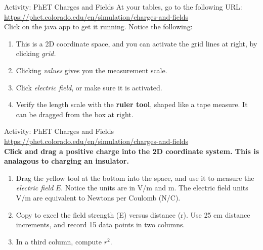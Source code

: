 \documentclass{beamer}
\begin{document}
\begin{frame}{Activity: PhET Charges and Fields}
At your tables, go to the following URL: \\ \vspace{0.2cm}
\url{https://phet.colorado.edu/en/simulation/charges-and-fields} \\ \vspace{0.2cm}
Click on the java app to get it running.  Notice the following:
\begin{enumerate}
\item This is a 2D coordinate space, and you can activate the grid lines at right, by clicking \textit{grid.}
\item Clicking \textit{values} gives you the measurement scale.
\item Click \textit{electric field}, or make sure it is activated.
\item Verify the length scale with the \textbf{ruler tool}, shaped like a tape measure.  It can be dragged from the box at right.
\end{enumerate}
\end{frame}

\begin{frame}{Activity: PhET Charges and Fields}
\small
\url{https://phet.colorado.edu/en/simulation/charges-and-fields} \\ \vspace{0.2cm}
\textbf{Click and drag a positive charge into the 2D coordinate system.  This is analagous to charging an insulator.}
\begin{enumerate}
\item Drag the yellow tool at the bottom into the space, and use it to measure the \textit{electric field} $E$.  Notice the units are in V/m and m.  The electric field units V/m are equivalent to Newtons per Coulomb (N/C).
\item Copy to excel the field strength (E) versus distance (r).  Use 25 cm distance increments, and record 15 data points in two columns.
\item In a third column, compute $r^2$.
\end{enumerate}
\end{frame}
\end{document}

